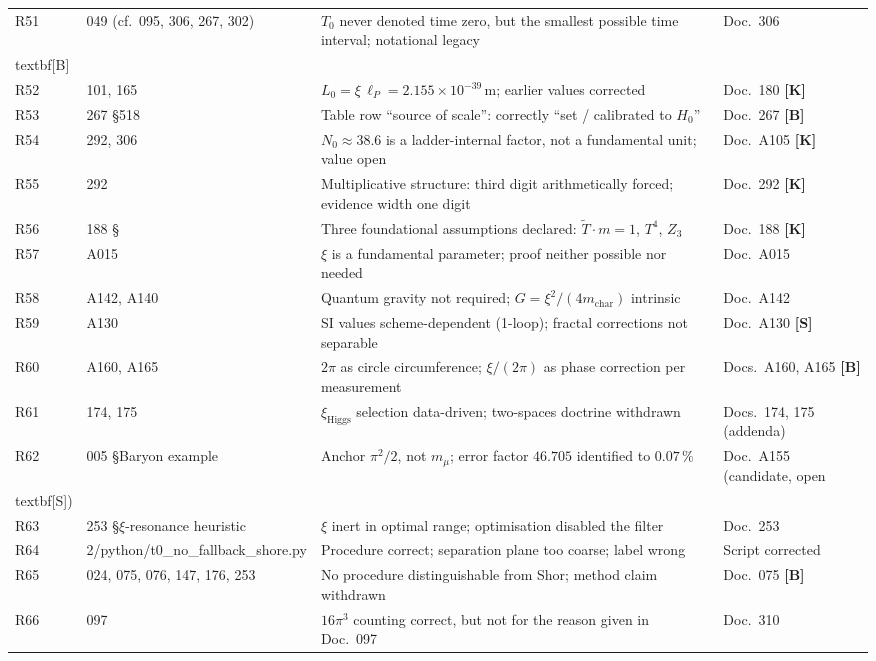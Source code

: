 \begin{longtable}{@{}p{1.2cm}p{3.4cm}p{5.8cm}p{3.4cm}@{}}
R51 & 049 (cf.\ 095, 306, 267, 302) & $T_0$ never denoted time zero, but the smallest possible time interval; notational legacy & Doc.~306 \\textbf{[B]} \\
R52 & 101, 165 & $L_0 = \xi\,\ell_P = 2.155\times10^{-39}$\,m; earlier values corrected & Doc.~180 \textbf{[K]} \\
R53 & 267 \S518 & Table row ``source of scale'': correctly ``set / calibrated to $H_0$'' & Doc.~267 \textbf{[B]} \\
R54 & 292, 306 & $N_0 \approx 38.6$ is a ladder-internal factor, not a fundamental unit; value open & Doc.~A105 \textbf{[K]} \\
R55 & 292 & Multiplicative structure: third digit arithmetically forced; evidence width one digit & Doc.~292 \textbf{[K]} \\
R56 & 188 \S & Three foundational assumptions declared: $\tilde{T}\cdot m=1$, $T^4$, $Z_3$ & Doc.~188 \textbf{[K]} \\
R57 & A015 & $\xi$ is a fundamental parameter; proof neither possible nor needed & Doc.~A015 \\
R58 & A142, A140 & Quantum gravity not required; $G=\xi^2/(4m_\text{char})$ intrinsic & Doc.~A142 \\
R59 & A130 & SI values scheme-dependent (1-loop); fractal corrections not separable & Doc.~A130 \textbf{[S]} \\
R60 & A160, A165 & $2\pi$ as circle circumference; $\xi/(2\pi)$ as phase correction per measurement & Docs.~A160, A165 \textbf{[B]} \\
R61 & 174, 175 & $\xi_\text{Higgs}$ selection data-driven; two-spaces doctrine withdrawn & Docs.~174, 175 (addenda) \\
R62 & 005 \S Baryon example & Anchor $\pi^2/2$, not $m_\mu$; error factor $46.705$ identified to $0.07\,\%$ & Doc.~A155 (candidate, open \\textbf{[S]}) \\
R63 & 253 \S $\xi$-resonance heuristic & $\xi$ inert in optimal range; optimisation disabled the filter & Doc.~253 \\
R64 & 2/python/t0\_no\_fallback\_shore.py & Procedure correct; separation plane too coarse; label wrong & Script corrected \\
R65 & 024, 075, 076, 147, 176, 253 & No procedure distinguishable from Shor; method claim withdrawn & Doc.~075 \textbf{[B]} \\
R66 & 097 & $16\pi^3$ counting correct, but not for the reason given in Doc.~097 & Doc.~310 \\

\end{longtable}
